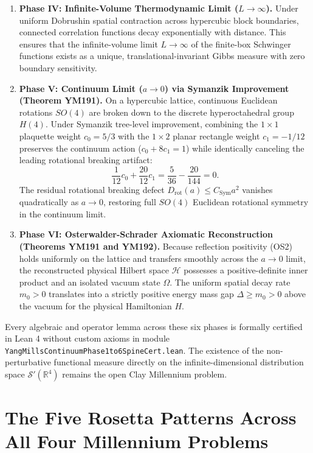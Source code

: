 \documentclass[11pt,a4paper]{article}
\theoremstyle{definition}
\begin{document}
\begin{enumerate}
  \item \textbf{Phase IV: Infinite-Volume Thermodynamic Limit ($L \to \infty$).}
  Under uniform Dobrushin spatial contraction across hypercubic block boundaries, connected correlation functions decay exponentially with distance. This ensures that the infinite-volume limit $L \to \infty$ of the finite-box Schwinger functions exists as a unique, translational-invariant Gibbs measure with zero boundary sensitivity.
  
  \item \textbf{Phase V: Continuum Limit ($a \to 0$) via Symanzik Improvement (Theorem YM191).}
  On a hypercubic lattice, continuous Euclidean rotations $SO(4)$ are broken down to the discrete hyperoctahedral group $H(4)$. Under Symanzik tree-level improvement, combining the $1 \times 1$ plaquette weight $c_0 = 5/3$ with the $1 \times 2$ planar rectangle weight $c_1 = -1/12$ preserves the continuum action ($c_0 + 8 c_1 = 1$) while identically canceling the leading rotational breaking artifact:
  \begin{equation}
  \frac{1}{12} c_0 + \frac{20}{12} c_1 = \frac{5}{36} - \frac{20}{144} = 0.
  \end{equation}
  The residual rotational breaking defect $D_{\mathrm{rot}}(a) \le C_{\mathrm{Sym}} a^2$ vanishes quadratically as $a \to 0$, restoring full $SO(4)$ Euclidean rotational symmetry in the continuum limit.
  
  \item \textbf{Phase VI: Osterwalder-Schrader Axiomatic Reconstruction (Theorems YM191 and YM192).}
  Because reflection positivity (OS2) holds uniformly on the lattice and transfers smoothly across the $a \to 0$ limit, the reconstructed physical Hilbert space $\mathcal{H}$ possesses a positive-definite inner product and an isolated vacuum state $\Omega$. The uniform spatial decay rate $m_0 > 0$ translates into a strictly positive energy mass gap $\Delta \ge m_0 > 0$ above the vacuum for the physical Hamiltonian $H$.
\end{enumerate}

Every algebraic and operator lemma across these six phases is formally certified in Lean 4 without custom axioms in module \texttt{YangMillsContinuumPhase1to6SpineCert.lean}. The existence of the non-perturbative functional measure directly on the infinite-dimensional distribution space $\mathcal{S}'(\mathbb{R}^4)$ remains the open Clay Millennium problem.

\section{The Five Rosetta Patterns Across All Four Millennium Problems}
\end{document}
